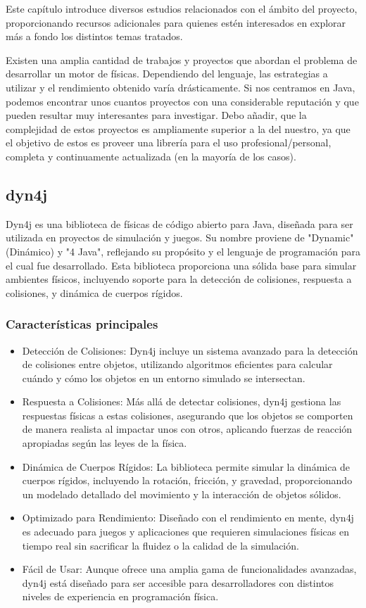 

Este capítulo introduce diversos estudios relacionados con el ámbito del proyecto, proporcionando recursos adicionales para quienes estén interesados en explorar más a fondo los distintos temas tratados.

Existen una amplia cantidad de trabajos y proyectos que abordan el problema de desarrollar un motor de físicas. Dependiendo del lenguaje, las estrategias a utilizar y el rendimiento obtenido varía drásticamente. Si nos centramos en Java, podemos encontrar unos cuantos proyectos con una considerable reputación y que pueden resultar muy interesantes para investigar. Debo añadir, que la complejidad de estos proyectos es ampliamente superior a la del nuestro, ya que el objetivo de estos es proveer una librería para el uso profesional/personal, completa y continuamente actualizada (en la mayoría de los casos).

\subsection{dyn4j}\cite{dyn4j}
Dyn4j es una biblioteca de físicas de código abierto para Java, diseñada para ser utilizada en proyectos de simulación y juegos. Su nombre proviene de "Dynamic" (Dinámico) y "4 Java", reflejando su propósito y el lenguaje de programación para el cual fue desarrollado. Esta biblioteca proporciona una sólida base para simular ambientes físicos, incluyendo soporte para la detección de colisiones, respuesta a colisiones, y dinámica de cuerpos rígidos.

\subsubsection{Características principales}
\begin{itemize}
    \item Detección de Colisiones: Dyn4j incluye un sistema avanzado para la detección de colisiones entre objetos, utilizando algoritmos eficientes para calcular cuándo y cómo los objetos en un entorno simulado se intersectan.
    \item Respuesta a Colisiones: Más allá de detectar colisiones, dyn4j gestiona las respuestas físicas a estas colisiones, asegurando que los objetos se comporten de manera realista al impactar unos con otros, aplicando fuerzas de reacción apropiadas según las leyes de la física.
    \item Dinámica de Cuerpos Rígidos: La biblioteca permite simular la dinámica de cuerpos rígidos, incluyendo la rotación, fricción, y gravedad, proporcionando un modelado detallado del movimiento y la interacción de objetos sólidos.
    \item Optimizado para Rendimiento: Diseñado con el rendimiento en mente, dyn4j es adecuado para juegos y aplicaciones que requieren simulaciones físicas en tiempo real sin sacrificar la fluidez o la calidad de la simulación.
    \item Fácil de Usar: Aunque ofrece una amplia gama de funcionalidades avanzadas, dyn4j está diseñado para ser accesible para desarrolladores con distintos niveles de experiencia en programación física.
\end{itemize}

